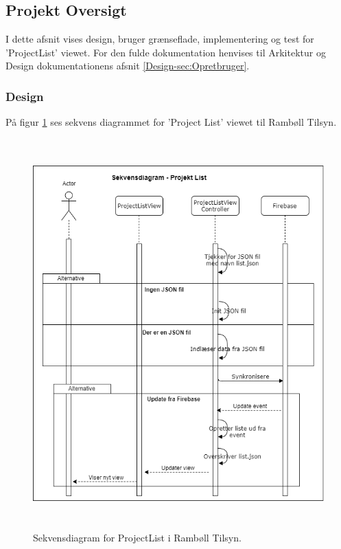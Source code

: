 \subsection{Projekt Oversigt}
I dette afsnit vises design, bruger grænseflade, implementering og test for 'ProjectList' viewet. For den fulde dokumentation henvises til Arkitektur og Design dokumentationens afsnit \ref{Design-sec:Opretbruger}.

\subsubsection{Design}
På figur \ref{fig:ProjctListSekvens} ses sekvens diagrammet for 'Project List' viewet til Rambøll Tilsyn.
\begin{figure}[H] %
	\centering
	\includegraphics[height=15cm, width=12cm]{../ArkitekturDesign/Design/ProjectList/ProjektListSekvensDiagram}
	\caption{Sekvensdiagram for ProjectList i Rambøll Tilsyn.}
	\label{fig:ProjctListSekvens}
\end{figure}

\clearpage

